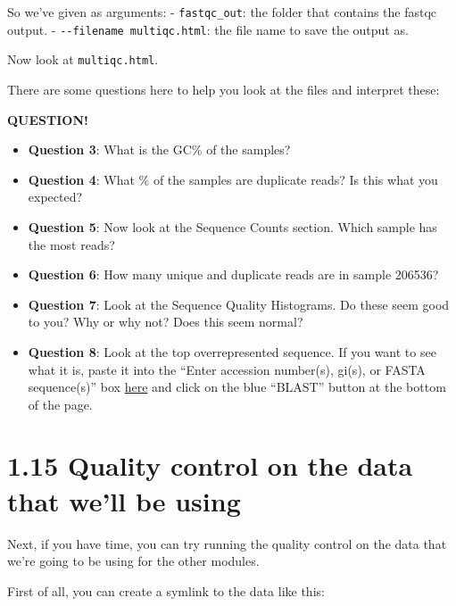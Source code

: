 \documentclass[
]{book}
\providecommand{\tightlist}{%
  \setlength{\itemsep}{0pt}\setlength{\parskip}{0pt}}
\newenvironment{bluebox}{
  \definecolor{shadecolor}{RGB}{172, 210, 237}
  \color{white}
  \begin{shaded}}
 {\end{shaded}}
\begin{document}
So we've given as arguments:
- \texttt{fastqc\_out}: the folder that contains the fastqc output.
- \texttt{-\/-filename\ multiqc.html}: the file name to save the output as.

Now look at \texttt{multiqc.html}.

There are some questions here to help you look at the files and interpret these:

\begin{bluebox}

\begin{center}
\textbf{QUESTION!}

\end{center}

\begin{itemize}
\tightlist
\item
  \textbf{Question 3}: What is the GC\% of the samples?
\item
  \textbf{Question 4}: What \% of the samples are duplicate reads? Is this what you expected?
\item
  \textbf{Question 5}: Now look at the Sequence Counts section. Which sample has the most reads?
\item
  \textbf{Question 6}: How many unique and duplicate reads are in sample 206536?
\item
  \textbf{Question 7}: Look at the Sequence Quality Histograms. Do these seem good to you? Why or why not? Does this seem normal?
\item
  \textbf{Question 8}: Look at the top overrepresented sequence. If you want to see what it is, paste it into the ``Enter accession number(s), gi(s), or FASTA sequence(s)'' box \href{https://blast.ncbi.nlm.nih.gov/Blast.cgi?PROGRAM=blastn&PAGE_TYPE=BlastSearch&LINK_LOC=blasthome}{here} and click on the blue ``BLAST'' button at the bottom of the page.
\end{itemize}

\end{bluebox}

\section{1.15 Quality control on the data that we'll be using}\label{quality-control-on-the-data-that-well-be-using}

Next, if you have time, you can try running the quality control on the data that we're going to be using for the other modules.

First of all, you can create a symlink to the data like this:
\end{document}
